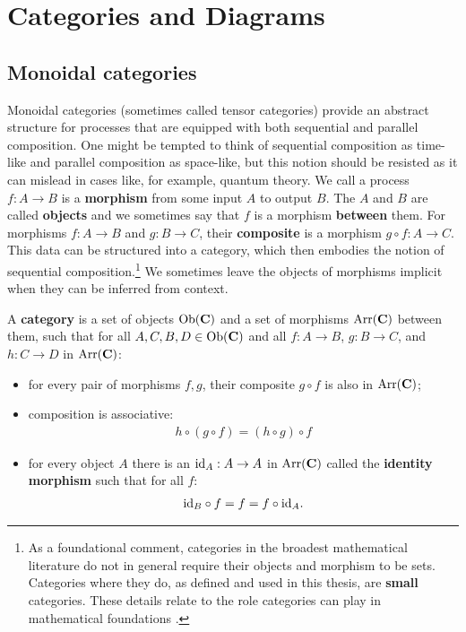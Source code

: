 \chapter{Categories and Diagrams}
\label{chap:cats}

\section{Monoidal categories}
Monoidal categories (sometimes called tensor categories) provide an abstract structure for processes that are equipped with both sequential and parallel composition. One might be tempted to think of sequential composition as time-like and parallel composition as space-like, but this notion should be resisted as it can mislead in cases like, for example, quantum theory.  We call a process $f:A\to B$ is a \textbf{morphism} from some input $A$ to output $B$. The $A$ and $B$ are called \textbf{objects} and we sometimes say that $f$ is a morphism \textbf{between} them. For morphisms $f:A\to B$ and $g:B\to C$, their \textbf{composite} is a morphism $g\circ f:A\to C$. This data can be structured into a category, which then embodies the notion of sequential composition.\footnote{As a foundational comment, categories in the broadest mathematical literature do not in general require their objects and morphism to be sets. Categories where they do, as defined and used in this thesis, are \textbf{small} categories. These details relate to the role categories can play in mathematical foundations \cite{mac1969one}.} We sometimes leave the objects of morphisms implicit when they can be inferred from context.

\begin{defn}
A \textbf{category}  is a set of objects $\mbox{Ob}(\mathbf{C})$ and a set of morphisms $\mbox{Arr}(\mathbf{C})$ between them, such that for all $A,C,B,D\in \mbox{Ob}(\mathbf{C})$ and all $f:A\to B$, $g:B\to C$, and $h:C\to D$ in $\mbox{Arr}(\mathbf{C})$:
\begin{itemize}
\item for every pair of morphisms $f,g$, their composite $g\circ f$ is also in $\mbox{Arr}(\mathbf{C})$;
\item composition is associative:
\begin{align}
h\circ(g\circ f) = (h\circ g)\circ f
\end{align}
\item for every object $A$ there is an $\mbox{id}_{A}:A\to A$ in $\mbox{Arr}(\mathbf{C})$ called the \textbf{identity morphism} such that for all $f$:
\begin{align}
\mbox{id}_{B}\circ f = f = f\circ\mbox{id}_{A}.
\end{align}
\end{itemize}
\end{defn}

